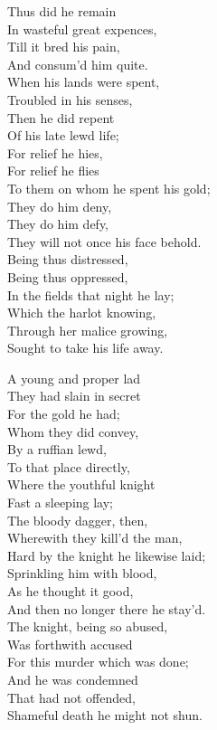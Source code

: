 \settowidth{\versewidth}{He bade from thence they should her take.}
\begin{dcverse}\begin{patverse}
Thus did he remain\\
In wasteful great expences,\\
Till it bred his pain,\\
And consum’d him quite.\\
When his lands were spent,\\
Troubled in his senses,\\
Then he did repent\\
Of his late lewd life;\\
For relief he hies,\\
For relief he flies\\
To them on whom he spent his gold;\\
They do him deny,\\
They do him defy,\\
They will not once his face behold.\\
Being thus distressed,\\
Being thus oppressed,\\
In the fields that night he lay;\\
Which the harlot knowing,\\
Through her malice growing,\\
Sought to take his life away.
\end{patverse}

\begin{patverse}
A young and proper lad\\
They had slain in secret\\
For the gold he had;\\
Whom they did convey,\\
By a ruffian lewd,\\
To that place directly,\\
Where the youthful knight\\
Fast a sleeping lay;\\
The bloody dagger, then,\\
Wherewith they kill’d the man,\\
Hard by the knight he likewise laid;\\
Sprinkling him with blood,\\
As he thought it good,\\
And then no longer there he stay’d.\\
The knight, being so abused,\\
Was forthwith accused\\
For this murder which was done;\\
And he was condemned\\
That had not offended,\\
Shameful death he might not shun.
\end{patverse}


\end{dcverse}
